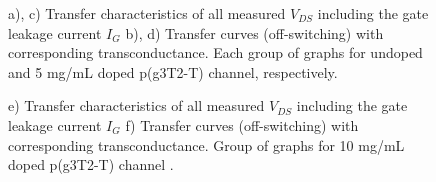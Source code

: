 \begin{figure}[!ht]
\caption[Transfer characteristics and transconductance at different doping levels and $V_{DS}$]{a), c) %
Transfer characteristics of all measured $V_{DS}$ including the gate leakage current $I_{G}$ b), d) %
Transfer curves (off-switching) with corresponding transconductance. Each group of graphs for undoped and 5 mg/mL %
doped p(g3T2-T) channel, respectively.}
    \label{fig:transx2}
\end{figure}
    
\begin{figure}[!ht]
	\ContinuedFloat
    \centering
    \caption[Transfer characteristics and transconductance at different doping levels and $V_{DS}$]{%
    e) Transfer characteristics of all measured $V_{DS}$ including the gate leakage current $I_{G}$ %
    f) Transfer curves (off-switching) with corresponding transconductance. %
    Group of graphs for %
    10 mg/mL doped p(g3T2-T) channel%
    .}
    \label{fig:transx2}
\end{figure}

